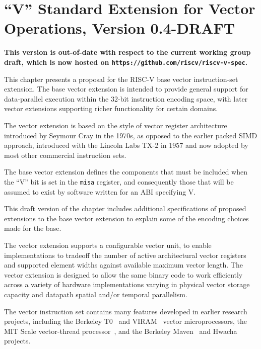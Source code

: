 \chapter{``V'' Standard Extension for Vector Operations, Version 0.4-DRAFT}
\label{sec:bits}

{\bf This version is out-of-date with respect to the current working
  group draft, which is now hosted on {\tt https://github.com/riscv/riscv-v-spec}.}

This chapter presents a proposal for the RISC-V base vector
instruction-set extension.  The base vector extension is intended to
provide general support for data-parallel execution within the 32-bit
instruction encoding space, with later vector extensions supporting
richer functionality for certain domains.

\begin{commentary}
The vector extension is based on the style of vector register
architecture introduced by Seymour Cray in the 1970s, as opposed to
the earlier packed SIMD approach, introduced with the Lincoln Labs
TX-2 in 1957 and now adopted by most other commercial instruction
sets.
\end{commentary}

The base vector extension defines the components that must be included
when the ``V'' bit is set in the {\tt misa} register, and consequently
those that will be assumed to exist by software written for an ABI
specifying V.

\begin{commentary}
  This draft version of the chapter includes additional specifications
  of proposed extensions to the base vector extension to explain some
  of the encoding choices made for the base.
\end{commentary}

The vector extension supports a configurable vector unit, to enable
implementations to tradeoff the number of active architectural vector
registers and supported element widths against available maximum
vector length.  The vector extension is designed to allow the same
binary code to work efficiently across a variety of hardware
implementations varying in physical vector storage capacity and
datapath spatial and/or temporal parallelism.

\begin{commentary}
The vector instruction set contains many features developed in earlier
research projects, including the Berkeley T0~\cite{} and VIRAM~\cite{VIRAM}
vector microprocessors, the MIT Scale vector-thread processor~\cite{},
and the Berkeley Maven~\cite{} and Hwacha~\cite{} projects.
\end{commentary}

